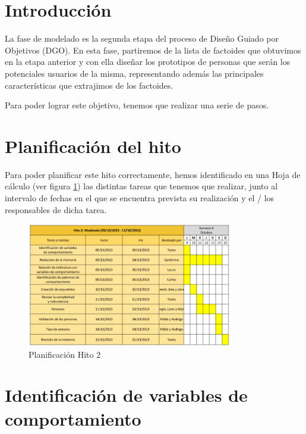 \section{Introducción}
La fase de modelado es la segunda etapa del proceso de Diseño Guiado por Objetivos (DGO). En esta fase, partiremos de la lista de factoides que
obtuvimos en la etapa anterior y con ella diseñar los prototipos de personas que serán los potenciales usuarios de la misma, representando además
las principales características que extrajimos de los factoides.

Para poder lograr este objetivo, tenemos que realizar una serie de pasos.
\section{Planificación del hito}
Para poder planificar este hito correctamente, hemos identificado en una Hoja de cálculo (ver figura \ref{fig:planif-hito2}) las distintas tareas que tenemos que 
realizar, junto al intervalo de fechas en el que se encuentra prevista su realización y el / los responsables de dicha tarea.
\begin{figure}[H]
    \centering 
    \includegraphics[width=0.8\textwidth]{./Imagenes/Planificaciones/Planif-hito2.png}
    \caption{Planificación Hito 2}
    \label{fig:planif-hito2}
\end{figure}

\section{Identificación de variables de comportamiento}
